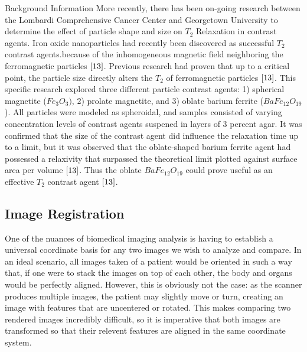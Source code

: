 \documentclass[a4paper,12pt]{article}
\begin{document}
\begin{section}{Background Information}
More recently, there has been on-going research between the Lombardi Comprehensive Cancer Center and Georgetown University to determine the effect of particle shape and size on $T_2$ Relaxation in contrast agents. Iron oxide nanoparticles had recently been discovered as successful $T_2$ contrast agents.because of the inhomogeneous magnetic field neighboring the ferromagnetic particles $\cite{13}$. Previous research had proven that up to a critical point, the particle size directly alters the $T_2$ of ferromagnetic particles $\cite{13}$. This specific research explored three different particle contrast agents: 1) spherical magnetite ($Fe_3 O_3)$, 2) prolate magnetite, and 3) oblate barium ferrite ($BaFe_{12}O_{19}$). All particles were modeled as spheroidal, and samples consisted of varying concentration levels of contrast agents suspened in layers of 3 percent agar. It was confirmed that the size of the contrast agent did influence the relaxation time up to a limit, but it was observed that the oblate-shaped barium ferrite agent had possessed a relaxivity that surpassed the theoretical limit plotted against surface area per volume $\cite{13}$. Thus the oblate $BaFe_{12}O_{19}$ could prove useful as an effective $T_2$ contrast agent $\cite{13}$.

\subsection{Image Registration}

One of the nuances of biomedical imaging analysis is having to establish a universal coordinate basis for any two images we wish to analyze and compare. In an ideal scenario, all images taken of a patient would be oriented in such a way that, if one were to stack the images on top of each other, the body and organs would be perfectly aligned. However, this is obviously not the case: as the scanner produces multiple images, the patient may slightly move or turn, creating an image with features that are uncentered or rotated. This makes comparing two rendered images incredibly difficult, so it is imperative that both images are transformed so that their relevent features are aligned in the same coordinate system. 



\end{section}
\end{document}
